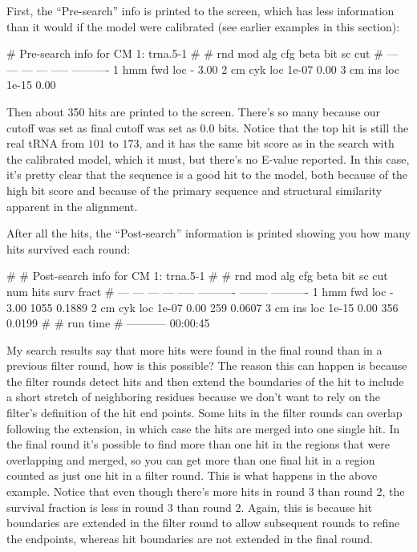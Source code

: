 
First, the ``Pre-search'' info is printed to the screen, which has
less information than it would if the model were calibrated (see
earlier examples in this section): 

\begin{sreoutput}
# Pre-search info for CM 1: trna.5-1
#
# rnd  mod  alg  cfg   beta  bit sc cut
# ---  ---  ---  ---  -----  ----------
    1  hmm  fwd  loc      -        3.00
    2   cm  cyk  loc  1e-07        0.00
    3   cm  ins  loc  1e-15        0.00
\end{sreoutput}

Then about 350 hits are printed to the screen. There's so many because
our cutoff was set as final cutoff was set as $0.0$ bits. Notice that 
the top hit is still the real tRNA from $101$ to $173$, and it 
has the same bit score as in the search with the calibrated model,
which it must, but there's no E-value reported. In this case, it's
pretty clear that the sequence is a good hit to the model, both
because of the high bit score and because of the primary sequence and
structural similarity apparent in the  alignment. 

After all the hits, the ``Post-search'' information is printed showing
you how many hits survived each round:

\begin{sreoutput}
#
# Post-search info for CM 1: trna.5-1
#
# rnd  mod  alg  cfg   beta  bit sc cut  num hits  surv fract
# ---  ---  ---  ---  -----  ----------  --------  ----------
    1  hmm  fwd  loc      -        3.00      1055      0.1889
    2   cm  cyk  loc  1e-07        0.00       259      0.0607
    3   cm  ins  loc  1e-15        0.00       356      0.0199
#
#    run time
# -----------
     00:00:45
\end{sreoutput}

\begin{srefaq}{My search results say that more hits were found in the
final round than in a previous filter round, how is this possible?}
The reason this can happen is because the filter
rounds detect hits and then extend the boundaries of the hit to
include a short stretch of neighboring residues because
we don't want to rely on the filter's definition of the hit end
points. Some hits in the filter rounds can overlap following the
extension, in which case the hits are merged into one single hit. In the
final round it's possible to find more than one hit in the regions that
were overlapping and merged, so you can get more than one final hit in a
region counted as just one hit in a filter round. This is what happens
in the above example. Notice that even though there's more hits in
round 3 than round 2, the survival fraction is less in round 3 than
round 2. Again, this is because hit boundaries are extended in the
filter round to allow subsequent rounds to refine the endpoints,
whereas hit boundaries are not extended in the final round.
\end{srefaq}

